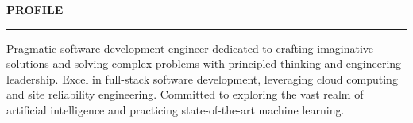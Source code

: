 \documentclass{cv}
\def\sectionskip{\medskip}
\begin{document}
\sectionskip
{} \textbf{PROFILE}
\sectionlineskip
\hrule

Pragmatic software development engineer dedicated to crafting imaginative solutions and solving complex problems with principled thinking and engineering leadership. Excel in full-stack software development, leveraging cloud computing and site reliability engineering. Committed to exploring the vast realm of artificial intelligence and practicing state-of-the-art machine learning.

    
\end{document}
